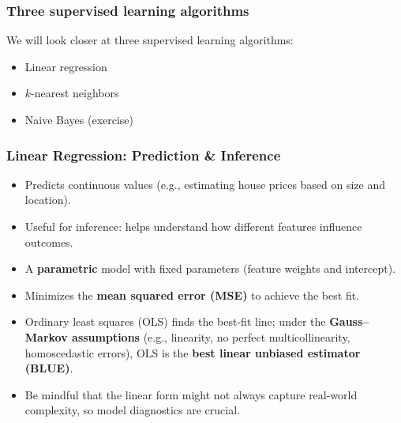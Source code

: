 \documentclass[aspectratio=169]{beamer}
\begin{document}
\begin{frame}
    \frametitle{Three supervised learning algorithms}
    We will look closer at three supervised learning algorithms:
    \begin{itemize}
        \item Linear regression
        \item $k$-nearest neighbors
        \item Naive Bayes (exercise)
    \end{itemize}
\end{frame}

\begin{frame}
    \frametitle{Linear Regression: Prediction \& Inference}
    \begin{itemize}
        \item Predicts continuous values (e.g., estimating house prices based on size and location).
        \pause
        \item Useful for inference: helps understand how different features influence outcomes.
        \pause
        \item A \textbf{parametric} model with fixed parameters (feature weights and intercept).
        \pause
        \item Minimizes the \textbf{mean squared error (MSE)} to achieve the best fit.
        \pause
        \item Ordinary least squares (OLS) finds the best-fit line; 
              under the \textbf{Gauss--Markov assumptions} (e.g., linearity, no perfect multicollinearity, homoscedastic errors), 
              OLS is the \textbf{best linear unbiased estimator (BLUE)}.
        \pause
        \item Be mindful that the linear form might not always capture real-world complexity, 
              so model diagnostics are crucial.
    \end{itemize}
\end{frame}
\end{document}

